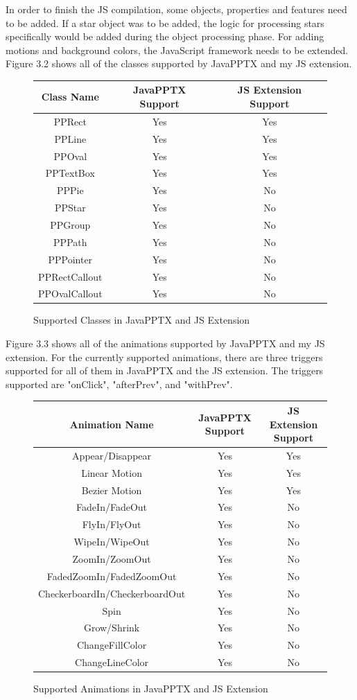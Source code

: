\documentclass[12pt,twoside]{reedthesis}
\begin{document}
In order to finish the JS compilation, some objects, properties and features need to be added. If a star object was to be added, the logic for processing stars specifically would be added during the object processing phase. For adding motions and background colors, the JavaScript framework needs to be extended. Figure 3.2 shows all of the classes supported by JavaPPTX and my JS extension. 
\begin{figure}[htbp]
\centering
\caption{Supported Classes in JavaPPTX and JS Extension}
\begin{tabular}{|c||c|c|} 
\hline 
Class Name & JavaPPTX Support & JS Extension Support\\ 
\hline \hline
PPRect & Yes & Yes\\ 
\hline 
PPLine & Yes & Yes\\
\hline
PPOval & Yes & Yes\\
\hline
PPTextBox & Yes & Yes\\
\hline
PPPie & Yes & No\\
\hline
PPStar & Yes & No\\
\hline
PPGroup & Yes & No\\
\hline
PPPath & Yes & No\\
\hline
PPPointer & Yes & No\\
\hline
PPRectCallout & Yes & No\\
\hline
PPOvalCallout & Yes & No\\
\hline
\end{tabular}
\end{figure}
Figure 3.3 shows all of the animations supported by JavaPPTX and my JS extension. For the currently supported animations, there are three triggers supported for all of them in JavaPPTX and the JS extension. The triggers supported are "onClick", "afterPrev", and "withPrev". 
\begin{figure}[htbp]
\centering
\caption{Supported Animations in JavaPPTX and JS Extension}
\begin{tabular}{|c||c|c|} 
\hline 
Animation Name & JavaPPTX Support & JS Extension Support\\ 
\hline \hline
Appear/Disappear & Yes & Yes\\ 
\hline 
Linear Motion & Yes & Yes\\
\hline
Bezier Motion & Yes & Yes\\
\hline
FadeIn/FadeOut & Yes & No\\
\hline
FlyIn/FlyOut & Yes & No\\
\hline
WipeIn/WipeOut & Yes & No\\
\hline
ZoomIn/ZoomOut & Yes & No\\
\hline
FadedZoomIn/FadedZoomOut & Yes & No\\
\hline
CheckerboardIn/CheckerboardOut & Yes & No\\
\hline
Spin & Yes & No\\
\hline
Grow/Shrink & Yes & No\\
\hline
ChangeFillColor & Yes & No\\
\hline
ChangeLineColor & Yes & No\\
\hline
\end{tabular}
\end{figure}
\end{document}
